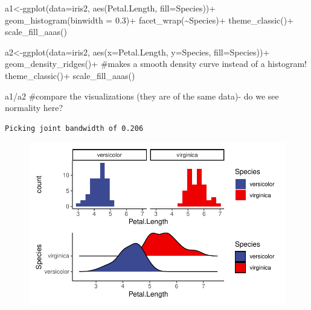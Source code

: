 \documentclass[
  letterpaper,
  DIV=11,
  numbers=noendperiod]{scrartcl}
\newenvironment{Shaded}{\begin{snugshade}}{\end{snugshade}}
\newcommand{\AttributeTok}[1]{\textcolor[rgb]{0.40,0.45,0.13}{#1}}
\newcommand{\CommentTok}[1]{\textcolor[rgb]{0.37,0.37,0.37}{#1}}
\newcommand{\FloatTok}[1]{\textcolor[rgb]{0.68,0.00,0.00}{#1}}
\newcommand{\FunctionTok}[1]{\textcolor[rgb]{0.28,0.35,0.67}{#1}}
\newcommand{\NormalTok}[1]{\textcolor[rgb]{0.00,0.23,0.31}{#1}}
\newcommand{\OtherTok}[1]{\textcolor[rgb]{0.00,0.23,0.31}{#1}}
\newcommand{\SpecialCharTok}[1]{\textcolor[rgb]{0.37,0.37,0.37}{#1}}
\begin{document}
\begin{Shaded}
\begin{Highlighting}[]
\NormalTok{a1}\OtherTok{\textless{}{-}}\FunctionTok{ggplot}\NormalTok{(}\AttributeTok{data=}\NormalTok{iris2, }\FunctionTok{aes}\NormalTok{(Petal.Length, }\AttributeTok{fill=}\NormalTok{Species))}\SpecialCharTok{+}
  \FunctionTok{geom\_histogram}\NormalTok{(}\AttributeTok{binwidth =} \FloatTok{0.3}\NormalTok{)}\SpecialCharTok{+} 
  \FunctionTok{facet\_wrap}\NormalTok{(}\SpecialCharTok{\textasciitilde{}}\NormalTok{Species)}\SpecialCharTok{+}
  \FunctionTok{theme\_classic}\NormalTok{()}\SpecialCharTok{+}
  \FunctionTok{scale\_fill\_aaas}\NormalTok{()}

\NormalTok{a2}\OtherTok{\textless{}{-}}\FunctionTok{ggplot}\NormalTok{(}\AttributeTok{data=}\NormalTok{iris2, }\FunctionTok{aes}\NormalTok{(}\AttributeTok{x=}\NormalTok{Petal.Length, }\AttributeTok{y=}\NormalTok{Species, }\AttributeTok{fill=}\NormalTok{Species))}\SpecialCharTok{+}
  \FunctionTok{geom\_density\_ridges}\NormalTok{()}\SpecialCharTok{+} \CommentTok{\#makes a smooth density curve instead of a histogram!}
  \FunctionTok{theme\_classic}\NormalTok{()}\SpecialCharTok{+}
  \FunctionTok{scale\_fill\_aaas}\NormalTok{()}

\NormalTok{a1}\SpecialCharTok{/}\NormalTok{a2 }\CommentTok{\#compare the visualizations (they are of the same data){-} do we see normality here?}
\end{Highlighting}
\end{Shaded}

\begin{verbatim}
Picking joint bandwidth of 0.206
\end{verbatim}

\begin{figure}[H]

{\centering \includegraphics{cor_reg_chi_files/figure-pdf/unnamed-chunk-23-1.pdf}

}

\end{figure}
\end{document}
